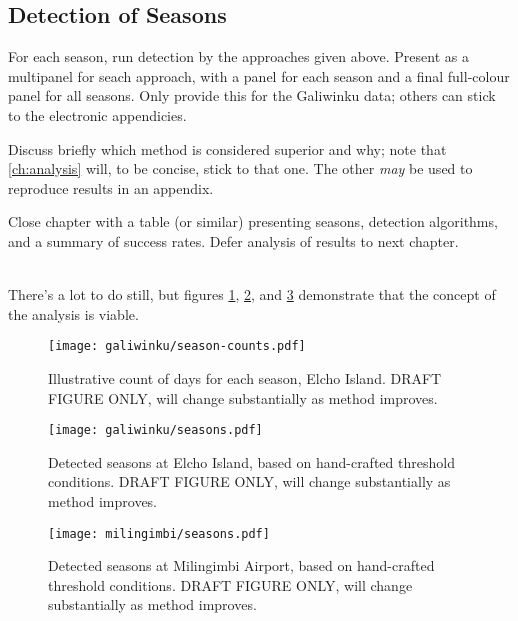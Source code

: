 \subsection{Detection of Seasons}
For each season, run detection by the approaches given above.
Present as a multipanel for seach approach, with a panel for each season
and a final full-colour panel for all seasons.  Only provide this for the
Galiwinku data; others can stick to the electronic appendicies.

Discuss briefly which method is considered superior and why; note
that \autoref{ch:analysis} will, to be concise, stick to that one.
The other \emph{may} be used to reproduce results in an appendix.

Close chapter with a table (or similar) presenting seasons, detection
algorithms, and a summary of success rates.  Defer analysis of results
to next chapter.

~\\

There's a lot to do still, but figures \ref{fig:galiwinku-season-counts},
\ref{fig:galiwinku-seasons}, and \ref{fig:milingimbi-seasons}
demonstrate that the concept of the analysis is viable.

\begin{figure}[h]
    \centering
    \texttt{[image: galiwinku/season-counts.pdf]}
    \caption[Calculated season frequency, Elcho Island]{
        Illustrative count of days for each season, Elcho Island.
        DRAFT FIGURE ONLY, will change substantially as method improves.
        }
    \label{fig:galiwinku-season-counts}
\end{figure}


\begin{figure}[p]
    \centering
    \texttt{[image: galiwinku/seasons.pdf]}
    \caption[Detected seasons for Elcho Island]{
        Detected seasons at Elcho Island, based on hand-crafted threshold conditions.
        DRAFT FIGURE ONLY, will change substantially as method improves.
        }
    \label{fig:galiwinku-seasons}
\end{figure}
\begin{figure}[p]
    \centering
    \texttt{[image: milingimbi/seasons.pdf]}
    \caption[Detected seasons for Milingimbi Airport]{
        Detected seasons at Milingimbi Airport, based on hand-crafted threshold conditions.
        DRAFT FIGURE ONLY, will change substantially as method improves.
        }
    \label{fig:milingimbi-seasons}
\end{figure}






